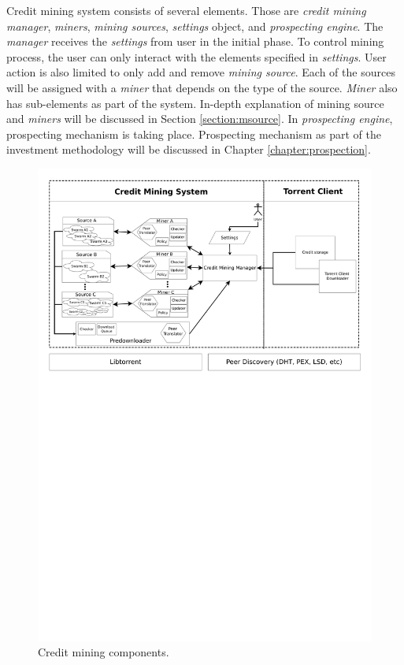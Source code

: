 Credit mining system consists of several elements. Those are \textit{credit mining manager}, \textit{miners}, \textit{mining sources}, \textit{settings} object, and \textit{prospecting engine}. The \textit{manager} receives the \textit{settings} from user in the initial phase. To control mining process, the user can only interact with the elements specified in \textit{settings}. User action is also limited to only add and remove \textit{mining source}. Each of the sources will be assigned with a \textit{miner} that depends on the type of the source. \textit{Miner} also has sub-elements as part of the system. In-depth explanation of mining source and \textit{miners} will be discussed in Section \ref{section:msource}. In \textit{prospecting engine}, prospecting mechanism is taking place. Prospecting mechanism as part of the investment methodology will be discussed in Chapter \ref{chapter:prospection}.

\begin{figure}[ht]
	\centering
 	\includegraphics[width=\textwidth]{pics/cm_components.pdf}
	\caption{Credit mining components.}
	\label{fig:cmcomponents}
\end{figure}

